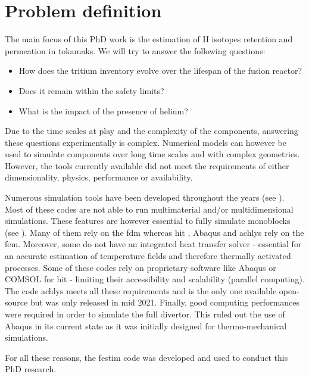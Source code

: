 \section{Problem definition}

The main focus of this PhD work is the estimation of H \glspl{isotope} \gls{retention} and permeation in \glspl{tokamak}.
We will try to answer the following questions:
\begin{itemize}
    \item How does the tritium \gls{inventory} evolve over the lifespan of the fusion reactor?
    \item Does it remain within the safety limits?
    \item What is the impact of the presence of helium?
\end{itemize}

Due to the time scales at play and the complexity of the components, answering these questions experimentally is complex.
Numerical models can however be used to simulate components over long time scales and with complex geometries.
However, the tools currently available did not meet the requirements of either dimensionality, physics, performance or availability.

Numerous simulation tools have been developed throughout the years (see ).
Most of these codes are not able to run multimaterial and/or multidimensional simulations.
These features are however essential to fully simulate monoblocks (see ).
Many of them rely on the \gls{fdm} whereas \acrshort{hit} , Abaqus  and \gls{achlys}  rely on the \gls{fem}.
Moreover, some do not have an integrated heat transfer solver - essential for an accurate estimation of temperature fields and therefore thermally activated processes.
Some of these codes rely on proprietary software like Abaqus or COMSOL for \acrshort{hit} - limiting their accessibility and scalability (parallel computing).
The code \gls{achlys} meets all these requirements and is the only one available open-source but was only released in mid 2021.
Finally, good computing performances were required in order to simulate the full \gls{divertor}.
This ruled out the use of Abaqus in its current state as it was initially designed for thermo-mechanical simulations.

For all these reasons, the \acrshort{festim} code was developed and used to conduct this PhD research.

